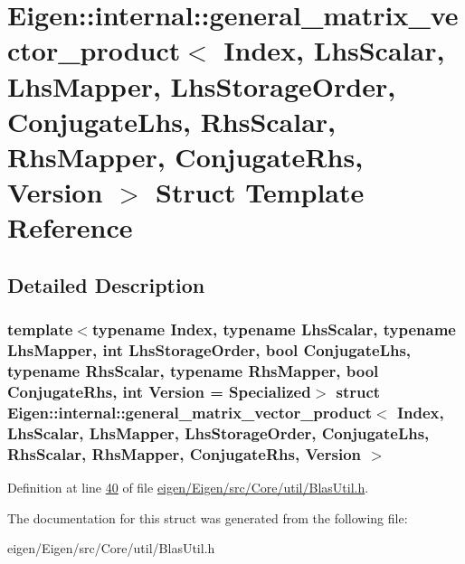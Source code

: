 \hypertarget{struct_eigen_1_1internal_1_1general__matrix__vector__product}{}\section{Eigen\+:\+:internal\+:\+:general\+\_\+matrix\+\_\+vector\+\_\+product$<$ Index, Lhs\+Scalar, Lhs\+Mapper, Lhs\+Storage\+Order, Conjugate\+Lhs, Rhs\+Scalar, Rhs\+Mapper, Conjugate\+Rhs, Version $>$ Struct Template Reference}
\label{struct_eigen_1_1internal_1_1general__matrix__vector__product}


\subsection{Detailed Description}
\subsubsection*{template$<$typename Index, typename Lhs\+Scalar, typename Lhs\+Mapper, int Lhs\+Storage\+Order, bool Conjugate\+Lhs, typename Rhs\+Scalar, typename Rhs\+Mapper, bool Conjugate\+Rhs, int Version = Specialized$>$\newline
struct Eigen\+::internal\+::general\+\_\+matrix\+\_\+vector\+\_\+product$<$ Index, Lhs\+Scalar, Lhs\+Mapper, Lhs\+Storage\+Order, Conjugate\+Lhs, Rhs\+Scalar, Rhs\+Mapper, Conjugate\+Rhs, Version $>$}



Definition at line \hyperlink{eigen_2_eigen_2src_2_core_2util_2_blas_util_8h_source_l00040}{40} of file \hyperlink{eigen_2_eigen_2src_2_core_2util_2_blas_util_8h_source}{eigen/\+Eigen/src/\+Core/util/\+Blas\+Util.\+h}.



The documentation for this struct was generated from the following file\+:\begin{DoxyCompactItemize}
\item 
eigen/\+Eigen/src/\+Core/util/\+Blas\+Util.\+h\end{DoxyCompactItemize}
